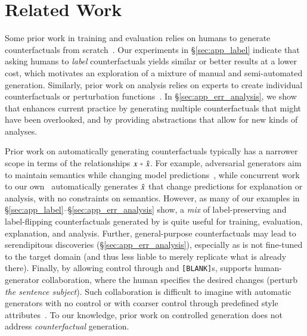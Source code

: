 \section{Related Work}
\label{sec:relate}

Some prior work in training and evaluation relies on humans to generate counterfactuals from scratch~\cite{gardner2020contrast, teney2020learning, kaushik2019learning}. 
Our experiments in \S\ref{sec:app_label} indicate that asking humans to \emph{label} \sysname{} counterfactuals yields similar or better results at a lower cost, which motivates an exploration of a mixture of manual and semi-automated generation. 
Similarly, prior work on analysis relies on experts to create individual counterfactuals or perturbation functions~\cite{wu2019errudite, checklist:acl20}. 
In \S\ref{sec:app_err_analysis}, we show that \sysname{} enhances current practice by generating multiple counterfactuals that might have been overlooked, and by providing abstractions that allow for new kinds of analyses.

Prior work on automatically generating counterfactuals typically has a narrower scope in terms of the relationships $x \veryshortarrow \xp$.
For example, adversarial generators aim to maintain semantics while changing model predictions~\cite{ribeiro2018semantically, iyyer2018adversarial, li2020contextualized}, while concurrent work to our own~\cite{madaan2020generate, ross2020explaining} automatically generates $\hat{x}$ that change predictions for explanation or analysis, with no constraints on semantics.
However, as many of our examples in \S\ref{sec:app_label}--\S\ref{sec:app_err_analysis} show, a \emph{mix} of label-preserving and label-flipping counterfactuals generated by \sysname is quite useful for training, evaluation, explanation, and analysis. 
Further, general-purpose counterfactuals may lead to serendipitous discoveries (\S\ref{sec:app_err_analysis}), especially as \sysname is not fine-tuned to the target domain (and thus less liable to merely replicate what is already there).
Finally, by allowing control through \tagstrs and \texttt{[BLANK]}s, \sysname{} supports human-generator collaboration, where the human specifies the desired changes (\eg perturb \emph{the sentence subject}).
Such collaboration is difficult to imagine with automatic generators with no control or with coarser control through predefined style attributes~\cite{madaan-etal-2020-politeness, malmi-etal-2020-unsupervised}. To our knowledge, prior work on controlled generation \cite{ctrl, pplm} does not address \emph{counterfactual} generation.


